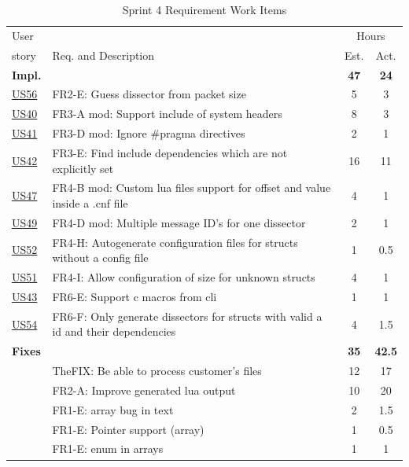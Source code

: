 \begin{table}[!htbp] \small \center
\caption{Sprint 4 Requirement Work Items \label{tab:sprint4req}}
\begin{tabularx}{\textwidth}{l X c c}
	\toprule
	User & & \multicolumn{2}{c}{Hours} \\
	\cmidrule(r){3-4}
	story & Req. and Description & Est. & Act. \\
	\midrule
	\textbf{Impl.} &  & \textbf{47} & \textbf{24} \\
	\hyperref[tab:req:stories13]{US56} & FR2-E: Guess \gls{dissector} from \gls{packet} size & 5 & 3 \\
 	\hyperref[tab:req:stories10]{US40} & FR3-A mod: Support \gls{include} of system \glspl{header} &  8  & 3 \\
	\hyperref[tab:req:stories10]{US41} & FR3-D mod: Ignore \#pragma directives & 2 & 1 \\
	\hyperref[tab:req:stories10]{US42} & FR3-E: Find include dependencies which are not explicitly set & 16  & 11 \\
	\hyperref[tab:req:stories11]{US47} & FR4-B mod: Custom \Gls{lua} files support for offset and value inside a .cnf file & 4 & 1 \\
	\hyperref[tab:req:stories12]{US49} & FR4-D mod: Multiple message ID's for one \gls{dissector} & 2 & 1 \\
	\hyperref[tab:req:stories12]{US52} & FR4-H: Autogenerate configuration files for \glspl{struct} without a config file & 1  & 0.5\\
	\hyperref[tab:req:stories12]{US51} & FR4-I: Allow configuration of size for unknown \glspl{struct} & 4 & 1 \\
	\hyperref[tab:req:stories10]{US43} & FR6-E: Support \Gls{c} macros from \gls{cli} & 1 & 1 \\
	\hyperref[tab:req:stories12]{US54} & FR6-F: Only generate \glspl{dissector} for \glspl{struct} with valid a id and their dependencies & 4 & 1.5 \\
	\addlinespace
	\textbf{Fixes} &  & \textbf{35} & \textbf{42.5} \\
	& TheFIX: Be able to process customer's files & 12 & 17 \\
	 & FR2-A: Improve generated \Gls{lua} output & 10 & 20 \\
	 & FR1-E: \Gls{array} bug in text & 2 & 1.5 \\
	 & FR1-E: Pointer support (array) & 1 & 0.5 \\
	 & FR1-E: \Gls{enum} in \glspl{array} & 1 & 1 \\		

\end{tabularx}
\end{table}

